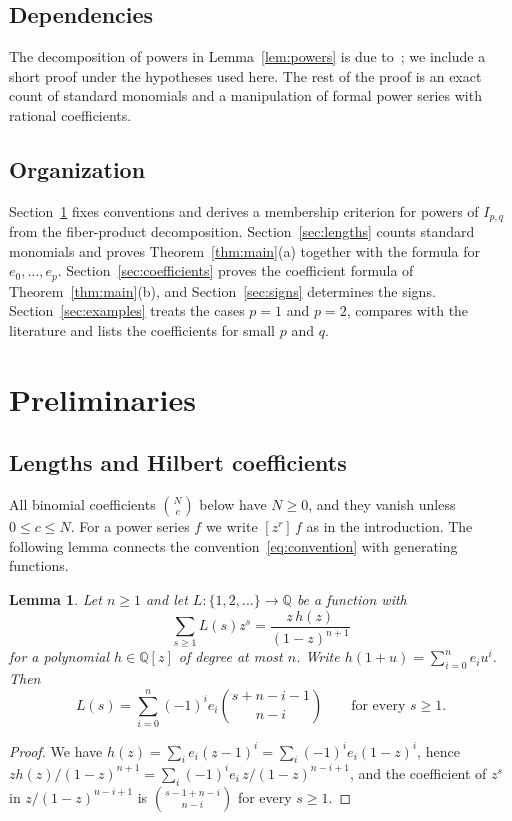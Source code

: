 \documentclass{amsart}
\newtheorem{lemma}[theorem]{Lemma}
\theoremstyle{definition}
\theoremstyle{remark}
\numberwithin{equation}{section}
\newcommand{\QQ}{\mathbb{Q}}
\newcommand{\cf}[1]{[#1]\,}
\begin{document}
\subsection*{Dependencies}
The decomposition of powers in Lemma~\ref{lem:powers} is due to~\cite{NV,DNSF};
we include a short proof under the hypotheses used here. The rest of the proof
is an exact count of standard monomials and a manipulation of formal power
series with rational coefficients.

\subsection*{Organization}
Section~\ref{sec:prelim} fixes conventions and derives a membership criterion
for powers of $I_{p,q}$ from the fiber-product decomposition.
Section~\ref{sec:lengths} counts standard monomials and proves
Theorem~\ref{thm:main}(a) together with the formula for $e_0,\dots,e_p$.
Section~\ref{sec:coefficients} proves the coefficient formula of
Theorem~\ref{thm:main}(b), and Section~\ref{sec:signs} determines the signs.
Section~\ref{sec:examples} treats the cases $p=1$ and $p=2$, compares with the
literature and lists the coefficients for small $p$ and $q$.

\section{Preliminaries}\label{sec:prelim}

\subsection{Lengths and Hilbert coefficients}
All binomial coefficients $\binom{N}{c}$ below have $N\ge0$, and they vanish
unless $0\le c\le N$. For a power series $f$ we write
$\cf{z^r}f$ as in the introduction. The following lemma connects the
convention~\eqref{eq:convention} with generating functions.

\begin{lemma}\label{lem:numerator}
Let $n\ge1$ and let $L\colon\{1,2,\dots\}\to\QQ$ be a function with
\[
  \sum_{s\ge1}L(s)z^s=\frac{z\,h(z)}{(1-z)^{n+1}}
\]
for a polynomial $h\in\QQ[z]$ of degree at most $n$. Write
$h(1+u)=\sum_{i=0}^{n}e_iu^i$. Then
\[
  L(s)=\sum_{i=0}^{n}(-1)^ie_i\binom{s+n-i-1}{n-i}\qquad\text{for every }s\ge1.
\]
\end{lemma}

\begin{proof}
We have $h(z)=\sum_i e_i(z-1)^i=\sum_i(-1)^ie_i(1-z)^i$, hence
$zh(z)/(1-z)^{n+1}=\sum_i(-1)^ie_i\,z/(1-z)^{n-i+1}$, and the coefficient of
$z^s$ in $z/(1-z)^{n-i+1}$ is $\binom{s-1+n-i}{n-i}$ for every $s\ge1$.
\end{proof}
\end{document}
